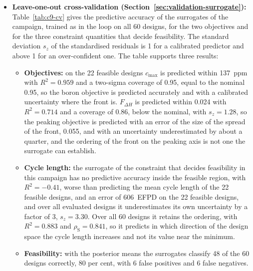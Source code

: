 \begin{itemize}
\item \textbf{Leave-one-out cross-validation
        (Section~\ref{sec:validation-surrogate}):} Table~\ref{tab:c9-cv}
        gives the predictive accuracy of the surrogates of the campaign,
        trained as in the loop on all 60 designs, for the two objectives
        and for the three constraint quantities that decide feasibility.
        The standard deviation $s_z$ of the standardised residuals is 1
        for a calibrated predictor and above 1 for an over-confident one. The table supports three results:
        \begin{itemize}
          \item \textbf{Objectives:} on the 22 feasible designs
                $c_\mathrm{max}$ is predicted within \SI{137}{ppm} with
                $R^2 = 0.959$ and a two-sigma coverage of 0.95, equal to
                the nominal 0.95, so the boron objective is predicted
                accurately and with a calibrated uncertainty where the
                front is. $F_{\Delta H}$ is predicted within 0.024 with
                $R^2 = 0.714$ and a coverage of 0.86, below the nominal,
                with $s_z = 1.28$, so the peaking objective is predicted
                with an error of the size of the spread of the front,
                0.055, and with an uncertainty underestimated by about a
                quarter, and the ordering of the front on the peaking
                axis is not one the surrogate can establish.
          \item \textbf{Cycle length:} the surrogate of the constraint
                that decides feasibility in this campaign has no
                predictive accuracy inside the feasible region, with
                $R^2 = -0.41$, worse than predicting the mean cycle length of the 22 feasible designs,
                and an error of \SI{606}{EFPD} on the 22 feasible
                designs, and over all evaluated designs it
                underestimates its own uncertainty by a factor of 3,
                $s_z = 3.30$. Over all 60 designs it retains the
                ordering, with $R^2 = 0.883$ and $\rho_\mathrm{S} = 0.841$,
                so it predicts in which direction of the design space
                the cycle length increases and not its value near the
                minimum.
          \item \textbf{Feasibility:} with the posterior means the
                surrogates classify 48 of the 60 designs correctly, 80
                per cent, with 6 false positives and 6 false negatives.

\end{itemize}
\end{itemize}
